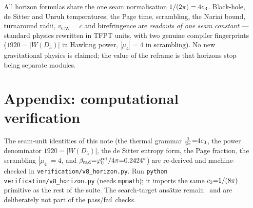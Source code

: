 \begin{keybox}[Net]
All horizon formulas share the one seam normalisation $1/(2\pi)=4c_3$. Black-hole, de Sitter and Unruh
temperatures, the Page time, scrambling, the Nariai bound, turnaround radii, $v_{\mathrm{GW}}=c$ and
birefringence are \emph{readouts of one seam constant} --- standard physics rewritten in TFPT units, with
two genuine compiler fingerprints ($1920=|W(D_5)|$ in Hawking power, $|\mu_4|=4$ in scrambling). No new
gravitational physics is claimed; the value of the reframe is that horizons stop being separate modules.
\end{keybox}

\section*{Appendix: computational verification}
The seam-unit identities of this note (the thermal grammar $\tfrac1{2\pi}{=}4c_3$, the
power denominator $1920{=}|W(D_5)|$, the de Sitter entropy form, the Page fraction, the scrambling
$|\mu_4|{=}4$, and $\beta_{\rm rad}{=}\varphi_0^{\rm ret}/4\pi{=}0.2424^\circ$) are re-derived and machine-checked in
\texttt{verification/v8\_horizon.py}. Run \texttt{python verification/v8\_horizon.py} (needs
\texttt{mpmath}); it imports the same $c_3{=}1/(8\pi)$ primitive as the rest of the suite. The
search-target ans\"atze remain \mO\ and are deliberately not part of the pass/fail checks.




